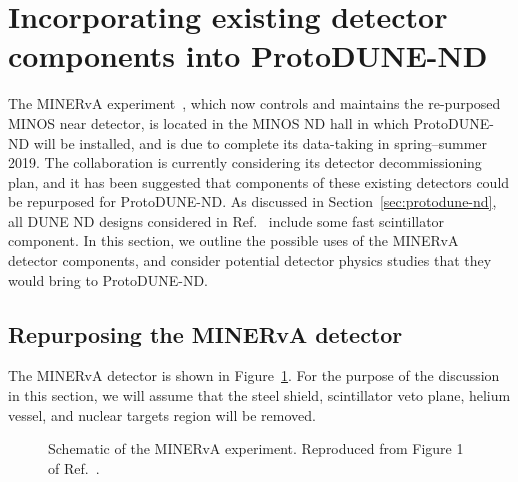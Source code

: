 \section{Incorporating existing detector components into ProtoDUNE-ND}
\label{sec:MINERvA}

The MINERvA experiment~\cite{minerva-nim}, which now controls and maintains the re-purposed MINOS near detector, is located in the MINOS ND hall in which ProtoDUNE-ND will be installed, and is due to complete its data-taking in spring--summer 2019. The collaboration is currently considering its detector decommissioning plan, and it has been suggested that components of these existing detectors could be repurposed for ProtoDUNE-ND. As discussed in Section~\ref{sec:protodune-nd}, all DUNE ND designs considered in Ref.~\cite{dune_ndcsg} include some fast scintillator component. In this section, we outline the possible uses of the MINERvA detector components, and consider potential detector physics studies that they would bring to ProtoDUNE-ND.

\subsection{Repurposing the MINERvA detector}
The MINERvA detector is shown in Figure~\ref{fig:minerva_detector}. For the purpose of the discussion in this section, we will assume that the steel shield, scintillator veto plane, helium vessel, and nuclear targets region will be removed. 
\begin{figure}[htb]
  \centering
  \caption{Schematic of the MINERvA experiment. Reproduced from Figure 1 of Ref.~\cite{minerva-nim}.}
  \label{fig:minerva_detector}
\end{figure}

